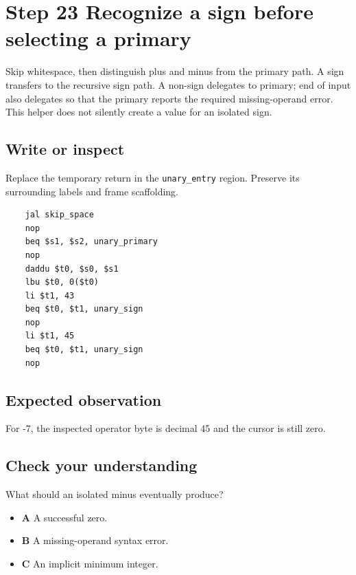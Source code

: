 \section{Step 23 Recognize a sign before selecting a primary}\label{expression-s23}

Skip whitespace, then distinguish plus and minus from the primary path. A sign transfers to the recursive sign path. A non-sign delegates to primary; end of input also delegates so that the primary reports the required missing-operand error. This helper does not silently create a value for an isolated sign.

\subsection{Write or inspect}
Replace the temporary return in the \texttt{unary\_entry} region. Preserve its surrounding labels and frame scaffolding.

\begin{verbatim}
    jal skip_space
    nop
    beq $s1, $s2, unary_primary
    nop
    daddu $t0, $s0, $s1
    lbu $t0, 0($t0)
    li $t1, 43
    beq $t0, $t1, unary_sign
    nop
    li $t1, 45
    beq $t0, $t1, unary_sign
    nop
\end{verbatim}
\subsection{Expected observation}
For -7, the inspected operator byte is decimal 45 and the cursor is still zero.

\subsection{Check your understanding}
What should an isolated minus eventually produce?

\begin{itemize}
  \item \textbf{A} A successful zero.
  \item \textbf{B} A missing-operand syntax error.
  \item \textbf{C} An implicit minimum integer.
\end{itemize}
